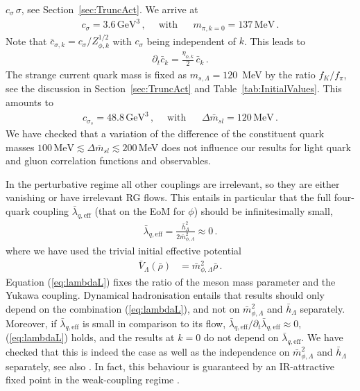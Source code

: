 \documentclass[%
reprint,
superscriptaddress,
showpacs,preprintnumbers,
 amsmath,amssymb,
 aps,
prd,
]{revtex4-1}
\def\Eq#1{Equation (\ref{#1})}
\def\eq#1{(\ref{#1})}
\def\sec#1{Section~\ref{#1}}
\begin{document}
$c_\sigma\, \sigma$, see \sec{sec:TruncAct}. We arrive at
%
\begin{align}\label{eq:ExChiral}
  c_\sigma = 3.6\, \textrm{GeV}^3\,,\quad\; \textrm{with }\quad\; 
  m_{\pi,k=0}= 137\, \textrm{MeV}\,.
\end{align}
%
Note that $\bar c_{\sigma,k}=c_\sigma/Z_{\phi,k}^{1/2}$ with
$c_\sigma$ being independent of $k$. This leads to
%
\begin{align}
  \partial_t \bar c_k = \frac{\eta_{\phi,k}}{2}\, \bar c_k\,.\label{}
\end{align}
%
The strange current quark mass is fixed as $m_{s,\Lambda}=120$\, MeV
by the ratio $f_K/f_\pi$, see the discussion in \sec{sec:TruncAct} and
Table~\ref{tab:InitialValues}.  This amounts to
%
\begin{align}\label{eq:ExChirals}
  c_{\sigma_s} = 48.8\, \textrm{GeV}^3\,,\quad\; \textrm{with }\quad\; 
  \Delta \bar m_{sl}= 120\, \textrm{MeV}\,.
\end{align}
%
We have checked that a variation of the difference of the constituent
quark masses
$100\, \textrm{MeV}\lesssim \Delta\bar m_{sl}\lesssim 200$\,MeV does
not influence our results for light quark and gluon correlation
functions and observables.

In the perturbative regime all other couplings are irrelevant, so they
are either vanishing or have irrelevant RG flows. This entails in
particular that the full four-quark coupling
$ \bar \lambda_{q,\textrm{eff}}$ (that on the EoM for $\phi$) should
be infinitesimally small,
%
\begin{align}\label{eq:lambdaL}
  \bar \lambda_{q,\textrm{eff}} = \frac{\bar h_\Lambda^2}{2
  \bar m_{\phi,\Lambda}^2}\approx 0\,.
\end{align}
%
where we have used the trivial initial effective potential
%
\begin{align}\label{eq:Vinitial}
  \bar V_{\Lambda}(\bar \rho)&=\bar m^2_{\phi,\Lambda}
                               \bar \rho\,.
\end{align}
%
\Eq{eq:lambdaL} fixes the ratio of the meson mass parameter and the
Yukawa coupling. Dynamical hadronisation entails that results should
only depend on the combination \eq{eq:lambdaL}, and not on
$\bar m_{\phi,\Lambda}^2$ and $\bar h_\Lambda$ separately.  Moreover,
if $\bar \lambda_{q,\textrm{eff}} $ is small in comparison to its
flow,
$\bar \lambda_{q,\textrm{eff}} /\partial_t \bar
\lambda_{q,\textrm{eff}} \approx 0$, \eq{eq:lambdaL} holds, and the
results at $k=0$ do not depend on $\bar \lambda_{q,\textrm{eff}} $. We
have checked that this is indeed the case as well as the independence
on $\bar m_{\phi,\Lambda}^2$ and $\bar h_\Lambda$ separately, see also
\cite{Braun:2014ata}. In fact, this behaviour is guaranteed by an
IR-attractive fixed point in the weak-coupling regime
\cite{Gies:2002hq}.
\end{document}
